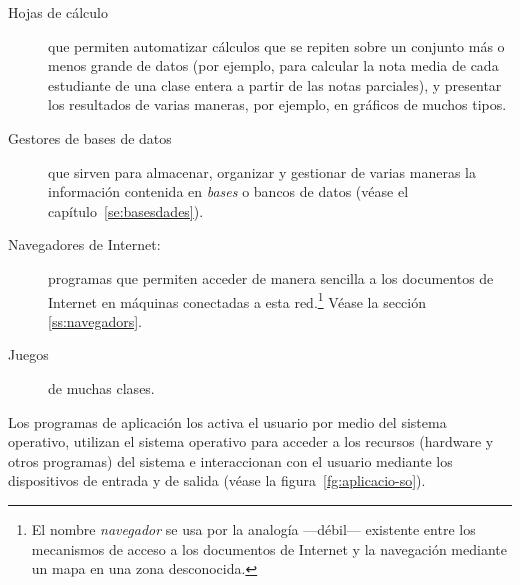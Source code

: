 \begin{description}
\begin{description}
\begin{description}
\item[Hojas de cálculo] que permiten automatizar cálculos que se repiten sobre un conjunto más o menos grande de datos (por ejemplo, para calcular la nota media de cada estudiante de una clase entera a partir de las notas parciales), y presentar los resultados de varias maneras, por ejemplo, en gráficos de muchos tipos. \item[Gestores de bases de datos] \label{pg:BD} que sirven para almacenar, organizar y gestionar de varias maneras la información contenida en \emph{bases} o bancos de datos (véase el capítulo~\ref{se:basesdades}). 

\item[Navegadores de Internet:] \label{pg:navegadors} programas que permiten acceder de manera sencilla a los documentos de Internet en máquinas conectadas a esta red.\footnote{El nombre \emph{navegador} se usa por la analogía ---débil--- existente entre los mecanismos de acceso a los documentos de Internet y la navegación mediante un mapa en una zona desconocida.} Véase la sección \ref{ss:navegadors}. 

\item[Juegos] de muchas clases. \end{description} \end{description} Los programas de aplicación los activa el usuario por medio del sistema operativo, utilizan el sistema operativo para acceder a los recursos (hardware y otros programas) del sistema e interaccionan con el usuario mediante los dispositivos de entrada y de salida (véase la figura~\ref{fg:aplicacio-so}). \end{description} 

